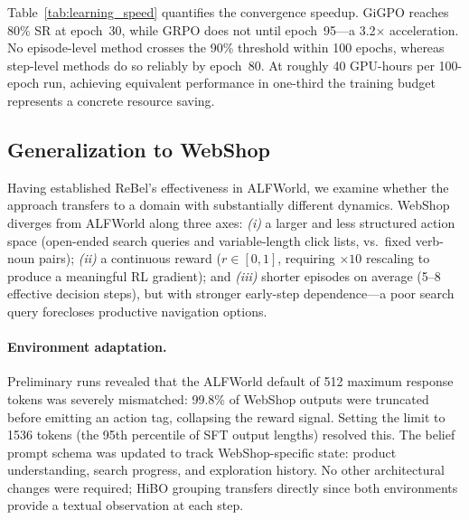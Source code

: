 Table~\ref{tab:learning_speed} quantifies the convergence speedup.
GiGPO reaches 80\% SR at epoch~30, while GRPO does not until epoch~95---a 3.2$\times$
acceleration.
No episode-level method crosses the 90\% threshold within 100 epochs, whereas
step-level methods do so reliably by epoch~80.
At roughly 40 GPU-hours per 100-epoch run, achieving equivalent performance in
one-third the training budget represents a concrete resource saving.


\subsection{Generalization to WebShop}
\label{sec:webshop}

Having established ReBel's effectiveness in ALFWorld, we examine whether the
approach transfers to a domain with substantially different dynamics.
WebShop diverges from ALFWorld along three axes: \textit{(i)} a larger and
less structured action space (open-ended search queries and variable-length click
lists, vs.\ fixed verb-noun pairs); \textit{(ii)} a continuous reward
($r \in [0,1]$, requiring $\times 10$ rescaling to produce a meaningful RL
gradient); and \textit{(iii)} shorter episodes on average (5--8 effective
decision steps), but with stronger early-step dependence---a poor search query
forecloses productive navigation options.

\paragraph{Environment adaptation.}
Preliminary runs revealed that the ALFWorld default of 512 maximum response tokens
was severely mismatched: 99.8\% of WebShop outputs were truncated before emitting
an action tag, collapsing the reward signal.
Setting the limit to 1536 tokens (the 95th percentile of SFT output lengths)
resolved this.
The belief prompt schema was updated to track WebShop-specific state:
product understanding, search progress, and exploration history.
No other architectural changes were required; HiBO grouping transfers directly
since both environments provide a textual observation at each step.

